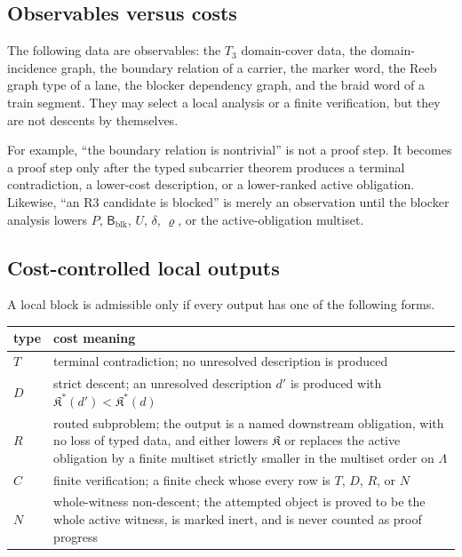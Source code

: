 \documentclass[11pt]{amsart}
\theoremstyle{definition}
\begin{document}
\subsection{Observables versus costs}

The following data are observables: the \(T_3\) domain-cover data, the
domain-incidence graph, the boundary relation of a carrier, the marker word,
the Reeb graph type of a lane, the blocker dependency graph, and the braid word
of a train segment. They may select a local analysis or a finite verification,
but they are not descents by themselves.

For example, ``the boundary relation is nontrivial'' is not a proof step. It
becomes a proof step only after the typed subcarrier theorem produces a
terminal contradiction, a lower-cost description, or a lower-ranked active
obligation. Likewise, ``an R3 candidate is blocked'' is merely an observation
until the blocker analysis lowers \(P\), \(\mathsf B_{\mathrm{blk}}\), \(U\),
\(\delta\), \(\varrho\), or the active-obligation multiset.

\subsection{Cost-controlled local outputs}

A local block is admissible only if every output has one of the following forms.

\begin{center}
\begin{tabular}{p{}p{}}
type & cost meaning \\ \hline
\(T\) & terminal contradiction; no unresolved description is produced \\
\(D\) & strict descent; an unresolved description \(d'\) is produced with \(\mathfrak K^\ast(d')<\mathfrak K^\ast(d)\) \\
\(R\) & routed subproblem; the output is a named downstream obligation, with no loss of typed data, and either lowers \(\mathfrak K\) or replaces the active obligation by a finite multiset strictly smaller in the multiset order on \(\Lambda\) \\
\(C\) & finite verification; a finite check whose every row is \(T\), \(D\), \(R\), or \(N\) \\
\(N\) & whole-witness non-descent; the attempted object is proved to be the whole active witness, is marked inert, and is never counted as proof progress \\
\end{tabular}
\end{center}
\end{document}
